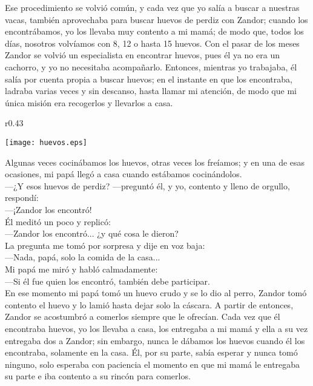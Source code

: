 Ese procedimiento se volvió común, y cada vez que yo salía a buscar a nuestras vacas, también aprovechaba para buscar huevos de perdiz con Zandor; cuando los encontrábamos, yo los llevaba muy contento a mi mamá; de modo que, todos los días, nosotros volvíamos con 8, 12 o hasta 15 huevos.
Con el pasar de los meses Zandor se volvió un especialista en encontrar huevos, pues él ya no era un cachorro, y yo no necesitaba acompañarlo. 
Entonces, mientras yo trabajaba, él salía por cuenta propia a buscar huevos; en el instante en que los encontraba, ladraba varias veces y sin descanso, hasta llamar mi atención, de modo que mi única misión era recogerlos y llevarlos a casa.
\ifdefined\EnableIncludeImages
\begin{wrapfigure}{r}{0.43\textwidth}
  \begin{center}
  \vspace{-20pt}
    \texttt{[image: huevos.eps]}
  \end{center}
  \vspace{-20pt}
\end{wrapfigure}
\fi
Algunas veces cocinábamos los huevos, otras veces los freíamos; y en una de esas ocasiones, mi papá llegó a casa cuando estábamos cocinándolos.\\\indent
---¿Y esos huevos de perdiz? ---preguntó él, 
y yo, contento y lleno de orgullo, respondí:\\\indent
---¡Zandor los encontró!\\\indent
Él meditó un poco y replicó:\\\indent 
---Zandor los encontró... ¿y qué cosa le dieron?\\\indent 
La pregunta me tomó por sorpresa y dije en voz baja:\\\indent 
---Nada, papá, solo la comida de la casa...\\\indent
Mi papá me miró y habló calmadamente:\\\indent 
---Si él fue quien los encontró, también debe participar.\\\indent
En ese momento mi papá tomó un huevo crudo y se lo dio al perro, Zandor tomó contento el huevo y lo lamió hasta dejar solo la cáscara. 
A partir de entonces, Zandor se acostumbró a comerlos siempre que le ofrecían. 
Cada vez que él encontraba huevos, yo los llevaba a casa, los entregaba a mi mamá y ella a su vez entregaba dos a Zandor; sin embargo, nunca le dábamos los huevos cuando él los encontraba, solamente en la casa. 
Él, por su parte, sabía esperar y nunca tomó ninguno, solo esperaba con paciencia el momento en que mi mamá le entregaba su parte e iba contento a su rincón para comerlos.


